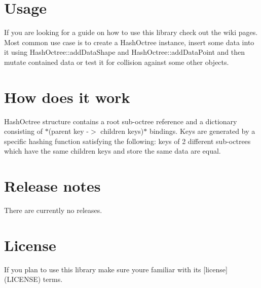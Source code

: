 \section*{Usage}

If you are looking for a guide on how to use this library check out the wiki pages. Most common use case is to create a Hash\+Octree instance, insert some data into it using {\ttfamily Hash\+Octree\+::add\+Data\+Shape} and {\ttfamily Hash\+Octree\+::add\+Data\+Point} and then mutate contained data or test it for collision against some other objects.

\section*{How does it work}

Hash\+Octree structure contains a root sub-\/octree reference and a dictionary consisting of $\ast$(parent key -\/$>$ children keys)$\ast$ bindings. Keys are generated by a specific hashing function satisfying the following\+: keys of 2 different sub-\/octrees which have the same children\textquotesingle{} keys and store the same data are equal.

\section*{Release notes}

There are currently no releases.

\section*{License}

If you plan to use this library make sure you\textquotesingle{}re familiar with its \mbox{[}license\mbox{]}(L\+I\+C\+E\+N\+SE) terms. 